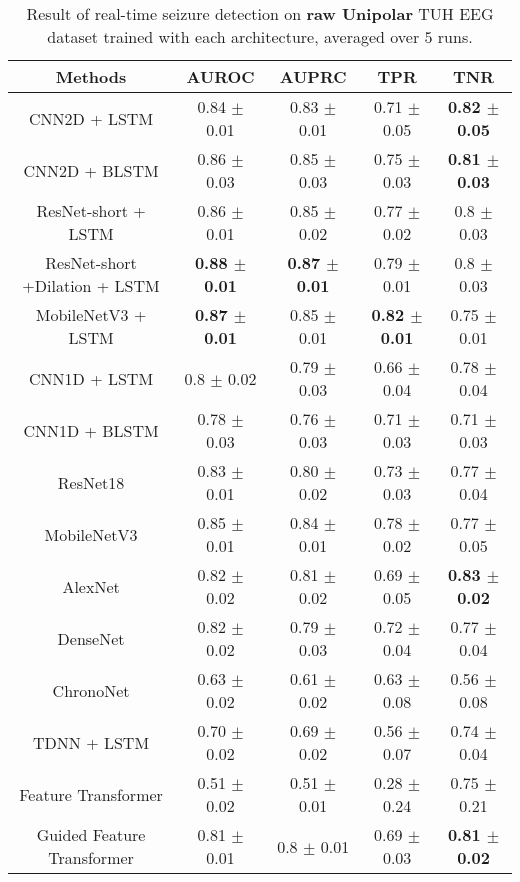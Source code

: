 \documentclass[pmlr,twocolumn,10pt]{jmlr}
\begin{document}
\begin{table*}[ht!]
	\footnotesize
	\centering
	\caption{Result of real-time seizure detection on \textbf{raw Unipolar} TUH EEG dataset trained with each architecture, averaged over $5$ runs.}
	\label{unipolar}
	\begin{tabular}{c|cccc}
		\toprule
		Methods & AUROC & AUPRC & TPR & TNR\\\midrule
		CNN2D + LSTM & 0.84 $\pm$ 0.01 
		& 0.83 $\pm$ 0.01 
		& 0.71 $\pm$ 0.05 
		& \textbf{0.82 $\pm$ 0.05} 
		\\
		CNN2D + BLSTM 
		& 0.86 $\pm$ 0.03 & 0.85 $\pm$ 0.03 & 0.75 $\pm$ 0.03 
		& \textbf{0.81 $\pm$ 0.03 }
		\\
		ResNet-short + LSTM 
		& 0.86 $\pm$ 0.01 
		& 0.85 $\pm$ 0.02 
		& 0.77 $\pm$ 0.02 
		& 0.8 $\pm$ 0.03 
		\\
		
		ResNet-short +Dilation + LSTM 
		& \textbf{0.88 $\pm$ 0.01}
		& \textbf{0.87 $\pm$ 0.01}
		& 0.79 $\pm$ 0.01 
		& 0.8 $\pm$ 0.03
		\\
		
		MobileNetV3 + LSTM 
		& \textbf{0.87 $\pm$ 0.01 }
		& 0.85 $\pm$ 0.01 
		& \textbf{0.82 $\pm$ 0.01}
		& 0.75 $\pm$ 0.01
		\\
		
		\midrule
		CNN1D + LSTM & 0.8 $\pm$ 0.02  & 0.79 $\pm$ 0.03  & 0.66 $\pm$ 0.04 & 0.78 $\pm$ 0.04\\
		CNN1D + BLSTM & 0.78 $\pm$ 0.03 & 0.76 $\pm$ 0.03 & 0.71 $\pm$ 0.03  & 0.71 $\pm$ 0.03\\
		\midrule
		ResNet18 & 0.83 $\pm$ 0.01 & 0.80 $\pm$ 0.02 & 0.73 $\pm$ 0.03 & 0.77 $\pm$ 0.04\\
		
		MobileNetV3 
		& 0.85 $\pm$ 0.01 
		& 0.84 $\pm$ 0.01 
		& 0.78 $\pm$ 0.02 
		& 0.77 $\pm$ 0.05\\
		
		AlexNet 
		& 0.82 $\pm$ 0.02 
		& 0.81 $\pm$ 0.02 
		& 0.69 $\pm$ 0.05 
		& \textbf{0.83 $\pm$ 0.02}
		\\
		DenseNet 
		& 0.82 $\pm$ 0.02 
		& 0.79 $\pm$ 0.03 
		& 0.72 $\pm$ 0.04 
		& 0.77 $\pm$ 0.04
		\\
		
		ChronoNet & 0.63 $\pm$ 0.02 & 0.61 $\pm$ 0.02 & 0.63 $\pm$ 0.08 & 0.56 $\pm$ 0.08\\
		TDNN + LSTM & 0.70 $\pm$ 0.02 & 0.69 $\pm$ 0.02 & 0.56 $\pm$ 0.07 & 0.74 $\pm$ 0.04\\
		\midrule
		Feature Transformer & 0.51 $\pm$  0.02 & 0.51 $\pm$ 0.01  & 0.28 $\pm$ 0.24 &  0.75 $\pm$ 0.21\\
		Guided Feature Transformer  & 0.81 $\pm$ 0.01  & 0.8 $\pm$ 0.01  & 0.69 $\pm$ 0.03 
		& \textbf{0.81 $\pm$ 0.02}\\
		\bottomrule
	\end{tabular}
\end{table*} 
\end{document}
